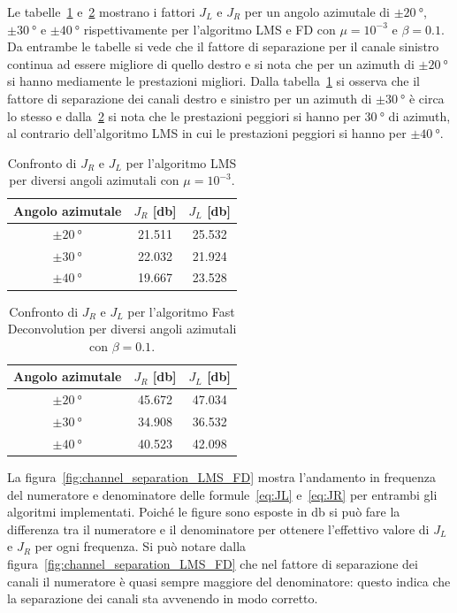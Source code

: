 \documentclass[12pt,a4paper,titlepage]{article}
\begin{document}
Le tabelle~\ref{tab:LMS_result_azimuth} e~\ref{tab:FD_result_azimuth} mostrano i fattori $J_L$ e $J_R$ per un angolo azimutale di $\pm \SI{20}{\degree}$,  $\pm \SI{30}{\degree}$ e $\pm \SI{40}{\degree}$ rispettivamente per l'algoritmo LMS e FD con $\mu = 10^{-3}$ e $\beta = 0.1$. Da entrambe le tabelle si vede che il fattore di separazione per il canale sinistro continua ad essere migliore di quello destro e si nota che per un azimuth di $\pm \SI{20}{\degree}$ si hanno mediamente le prestazioni migliori. Dalla tabella~\ref{tab:LMS_result_azimuth} si osserva che il fattore di separazione dei canali destro e sinistro per un azimuth di $\pm \SI{30}{\degree}$ è circa lo stesso e dalla~\ref{tab:FD_result_azimuth} si nota che le prestazioni peggiori si hanno per $\SI{30}{\degree}$ di azimuth, al contrario dell'algoritmo LMS in cui le prestazioni peggiori si hanno per $\pm \SI{40}{\degree}$.

\begin{table}[h]
\centering
\begin{tabular}{c c c}
\toprule
Angolo azimutale   & $J_R$ [\si{\decibel}]   & $J_L$ [\si{\decibel}]   \\ \midrule
$\pm \SI{20}{\degree}$ & 21.511 & 25.532\\
$\pm \SI{30}{\degree}$ & 22.032 & 21.924  \\
$\pm \SI{40}{\degree}$ & 19.667 & 23.528 \\ \bottomrule
\end{tabular}
\caption{\label{tab:LMS_result_azimuth}Confronto di $J_R$ e $J_L$ per l'algoritmo LMS per diversi angoli azimutali con $\mu = 10^{-3}$.}
\end{table}

\begin{table}[h]
\centering
\begin{tabular}{c c c}
\toprule
Angolo azimutale   & $J_R$ [\si{\decibel}]   & $J_L$ [\si{\decibel}]   \\ \midrule
$\pm \SI{20}{\degree}$ &  45.672 &  47.034\\
$\pm \SI{30}{\degree}$ &  34.908 & 36.532 \\
$\pm \SI{40}{\degree}$ &  40.523 &  42.098\\ \bottomrule
\end{tabular}
\caption{\label{tab:FD_result_azimuth}Confronto di $J_R$ e $J_L$ per l'algoritmo Fast Deconvolution per diversi angoli azimutali con $\beta = 0.1$.}
\end{table}

La figura~\ref{fig:channel_separation_LMS_FD} mostra l'andamento in frequenza del numeratore e denominatore delle formule~\eqref{eq:JL} e~\eqref{eq:JR} per entrambi gli algoritmi implementati. Poiché le figure sono esposte in \si{\decibel} si può fare la differenza tra il numeratore e il denominatore per ottenere l'effettivo valore di $J_L$ e $J_R$ per ogni frequenza. Si può notare dalla figura~\ref{fig:channel_separation_LMS_FD} che nel fattore di separazione dei canali il numeratore è quasi sempre maggiore del denominatore: questo indica che la separazione dei canali sta avvenendo in modo corretto. 
\end{document}
